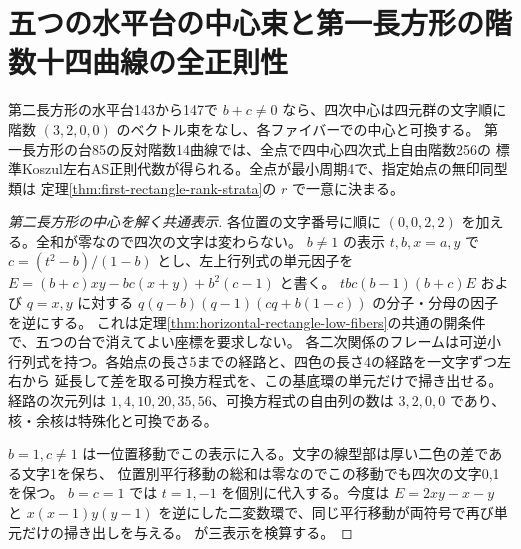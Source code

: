 \section{五つの水平台の中心束と第一長方形の階数十四曲線の全正則性}
\label{sec:rectangle-quartic-bundles}
\begin{theorem}\label{thm:rectangle-quartic-bundles}
第二長方形の水平台143から147で $b+c\ne0$ なら、四次中心は四元群の文字順に
階数 $(3,2,0,0)$ のベクトル束をなし、各ファイバーでの中心と可換する。
第一長方形の台85の反対階数14曲線では、全点で四中心四次式上自由階数256の
標準Koszul左右AS正則代数が得られる。全点が最小周期4で、指定始点の無印同型類は
定理\ref{thm:first-rectangle-rank-strata}の $r$ で一意に決まる。
\end{theorem}
\begin{proof}[第二長方形の中心を解く共通表示]
各位置の文字番号に順に $(0,0,2,2)$ を加える。全和が零なので四次の文字は変わらない。
$b\ne1$ の表示 $t,b,x=a,y$ で $c=(t^2-b)/(1-b)$ とし、左上行列式の単元因子を
$E=(b+c)xy-bc(x+y)+b^2(c-1)$ と書く。
$tbc(b-1)(b+c)E$ および $q=x,y$ に対する $q(q-b)(q-1)(cq+b(1-c))$ の分子・分母の因子を逆にする。
これは定理\ref{thm:horizontal-rectangle-low-fibers}の共通の開条件で、五つの台で消えてよい座標を要求しない。
各二次関係のフレームは可逆小行列式を持つ。各始点の長さ5までの経路と、四色の長さ4の経路を一文字ずつ左右から
延長して差を取る可換方程式を、この基底環の単元だけで掃き出せる。経路の次元列は
$1,4,10,20,35,56$、可換方程式の自由列の数は $3,2,0,0$ であり、核・余核は特殊化と可換である。

$b=1,c\ne1$ は一位置移動でこの表示に入る。文字の線型部は厚い二色の差である文字1を保ち、
位置別平行移動の総和は零なのでこの移動でも四次の文字0,1を保つ。
$b=c=1$ では $t=1,-1$ を個別に代入する。今度は $E=2xy-x-y$ と
$x(x-1)y(y-1)$ を逆にした二変数環で、同じ平行移動が両符号で再び単元だけの掃き出しを与える。
 が三表示を検算する。
\end{proof}

